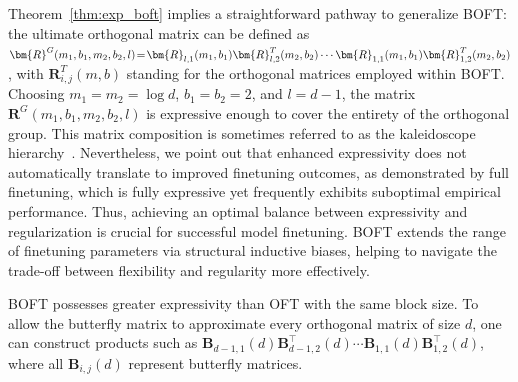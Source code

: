 Theorem~\ref{thm:exp_boft} implies a straightforward pathway to generalize BOFT: the ultimate orthogonal matrix can be defined as $\thickmuskip=2mu \medmuskip=2mu \bm{R}^G(m_1,b_1,m_2,b_2,l)=\bm{R}_{l,1}(m_1,b_1)\bm{R}_{l,2}^T(m_2,b_2)\cdots\bm{R}_{1,1}(m_1,b_1)\bm{R}_{1,2}^T(m_2,b_2)$, with $\bm{R}_{i,j}^T(m,b)$ standing for the orthogonal matrices employed within BOFT. Choosing $m_1=m_2=\log d$, $b_1=b_2=2$, and $l=d-1$, the matrix $\bm{R}^G(m_1,b_1,m_2,b_2,l)$ is expressive enough to cover the entirety of the orthogonal group. This matrix composition is sometimes referred to as the kaleidoscope hierarchy~\cite{dao2019kaleidoscope}. Nevertheless, we point out that enhanced expressivity does not automatically translate to improved finetuning outcomes, as demonstrated by full finetuning, which is fully expressive yet frequently exhibits suboptimal empirical performance. Thus, achieving an optimal balance between expressivity and regularization is crucial for successful model finetuning. BOFT extends the range of finetuning parameters via structural inductive biases, helping to navigate the trade-off between flexibility and regularity more effectively.

\begin{theorem}\label{thm:exp_boft}
    BOFT possesses greater expressivity than OFT with the same block size. To allow the butterfly matrix to approximate every orthogonal matrix of size $d$, one can construct products such as $\bm{B}_{d-1,1}(d)\bm{B}^\top_{d-1,2}(d)\cdots\bm{B}_{1,1}(d)\bm{B}^\top_{1,2}(d)$, where all $\bm{B}_{i,j}(d)$ represent butterfly matrices.
\end{theorem}


\begin{abstract}
Large foundation models are becoming increasingly prevalent, yet the high cost of training them from the ground up presents significant obstacles. Consequently, effective adaptation strategies for these sophisticated models to specific downstream tasks have become paramount. In this work, we examine Orthogonal Finetuning (OFT), a theoretically grounded finetuning methodology for task adaptation. Although OFT achieves strong generalization, it still requires substantial trainable parameters, primarily due to the large dimensions associated with orthogonal matrices. To overcome this limitation, we analyze OFT through the lens of information transmission and pinpoint several essential criteria for improving parameter efficiency. Drawing inspiration from the efficiency of the Cooley-Tukey fast Fourier transform, we introduce a novel orthogonal parameterization framework based on butterfly structures. By integrating this design with OFT, we develop Orthogonal Butterfly~(BOFT), a new finetuning approach that optimizes parameter efficiency. BOFT serves as a broad generalization of OFT, encompassing it as a particular instance. We support our method through comprehensive empirical evaluations involving the adaptation of large vision transformers, expansive language models, and text-to-image diffusion systems across a diverse range of vision and language downstream tasks.
\end{abstract}

